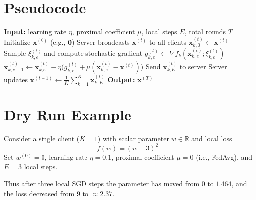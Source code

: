 \documentclass{article}
\newcommand{\R}{\mathbb{R}}
\begin{document}
\section*{Pseudocode}
\begin{algorithm}[H]
\caption{FedProx with Local SGD}
\begin{algorithmic}[1]
\State \textbf{Input:} learning rate $\eta$, proximal coefficient $\mu$, local steps $E$, total rounds $T$
\State Initialize $\mathbf{x}^{(0)}$ (e.g., $\mathbf{0}$)
    \State Server broadcasts $\mathbf{x}^{(t)}$ to all clients
        \State $\mathbf{x}^{(t)}_{k,0}\gets\mathbf{x}^{(t)}$
            \State Sample $\xi^{(t)}_{k,e}$ and compute stochastic gradient $g^{(t)}_{k,e}\gets\nabla f_k(\mathbf{x}^{(t)}_{k,e};\xi^{(t)}_{k,e})$
            \State $\mathbf{x}^{(t)}_{k,e+1}\gets\mathbf{x}^{(t)}_{k,e}
                -\eta\bigl(g^{(t)}_{k,e}
                +\mu(\mathbf{x}^{(t)}_{k,e}-\mathbf{x}^{(t)})\bigr)$
        \EndFor
        \State Send $\mathbf{x}^{(t)}_{k,E}$ to server
    \EndFor
    \State Server updates $\displaystyle\mathbf{x}^{(t+1)}\gets\frac1K\sum_{k=1}^{K}\mathbf{x}^{(t)}_{k,E}$
\EndFor
\State \textbf{Output:} $\mathbf{x}^{(T)}$
\end{algorithmic}
\end{algorithm}

\section*{Dry Run Example}
Consider a single client ($K=1$) with scalar parameter $w\in\R$ and local loss
\[
f(w)=(w-3)^{2}.
\]
Set $w^{(0)}=0$, learning rate $\eta=0.1$, proximal coefficient $\mu=0$ (i.e., FedAvg), and $E=3$ local steps.

Thus after three local SGD steps the parameter has moved from $0$ to $1.464$, and the loss decreased from $9$ to $$.
\end{document}
